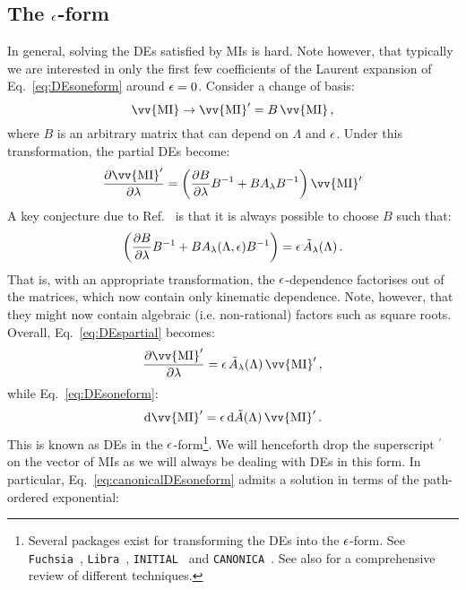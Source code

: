 \documentclass[main.tex]{subfiles}
\begin{document}
\subsection{The $\epsilon$-form} \label{sec:canonicalform}
In general, solving the DEs satisfied by MIs is hard. Note however, that typically we are interested in only the first few coefficients of the Laurent expansion of Eq.~\ref{eq:DEsoneform} around $\epsilon=0$. Consider a change of basis:
\begin{equation} \label{eq:basistransformation}
    \vv{\text{MI}} \rightarrow \vv{\text{MI}}^\prime = B\,\vv{\text{MI}}\,,
\end{equation}
where $B$ is an arbitrary matrix that can depend on $\Lambda$ and $\epsilon$. Under this transformation, the partial DEs become:
\begin{equation}
    \frac{\partial \vv{\text{MI}}^\prime}{\partial \lambda} = \left( \frac{\partial B}{\partial \lambda}B^{-1} + B A_{\lambda} B^{-1} \right) \vv{\text{MI}}^\prime
\end{equation}
A key conjecture due to Ref.~\cite{Henn:2013pwa} is that it is always possible to choose $B$ such that:
\begin{equation}
    \left( \frac{\partial B}{\partial \lambda}B^{-1} + B A_{\lambda}(\Lambda, \epsilon) B^{-1} \right) = \epsilon \, \tilde{A}_{\lambda}(\Lambda)\,.
\end{equation}
That is, with an appropriate transformation, the $\epsilon$-dependence factorises out of the matrices, which now contain only kinematic dependence. Note, however, that they might now contain algebraic (i.e. non-rational) factors such as square roots. Overall, Eq.~\ref{eq:DEspartial} becomes:
\begin{equation} \label{eq:canonicalDEspartial}
    \frac{\partial \vv{\text{MI}}^\prime}{\partial \lambda} = \eps \, \tilde{A}_{\lambda}(\Lambda) \, \vv{\text{MI}}^\prime\,, 
\end{equation}
while Eq.~\ref{eq:DEsoneform}:
\begin{equation} \label{eq:canonicalDEsoneform}
    \dd \vv{\text{MI}}^\prime = \eps \, \dd \tilde{A}(\Lambda) \,\vv{\text{MI}}^\prime\,.
\end{equation}
This is known as DEs in the $\epsilon$-form\footnote{Several packages exist for transforming the DEs into the $\epsilon$-form. See \texttt{Fuchsia}~\cite{Gituliar:2017vzm}, \texttt{Libra}~\cite{Lee:2020zfb}, \texttt{INITIAL}~\cite{Dlapa:2020cwj} and \texttt{CANONICA}~\cite{Meyer:2018feh}. See also \cite{Dlapa:2022nct} for a comprehensive review of different techniques.}. We will henceforth drop the superscript $^\prime$ on the vector of MIs as we will always be dealing with DEs in this form. In particular, Eq.~\ref{eq:canonicalDEsoneform} admits a solution in terms of the path-ordered exponential:
\end{document}
